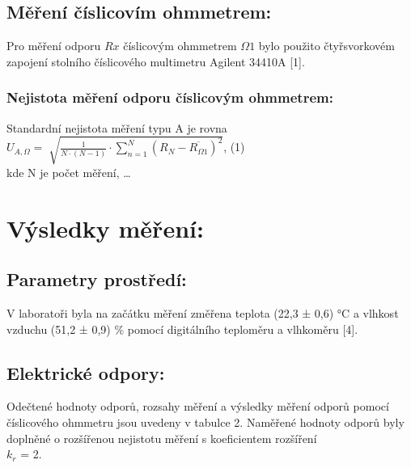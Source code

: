 \documentclass{article}
\begin{document}
	\subsection{Měření číslicovím ohmmetrem:}
	Pro měření odporu $Rx$ číslicovým ohmmetrem $\Omega 1$ bylo použito čtyřsvorkovém zapojení stolního číslicového multimetru Agilent 34410A [1].
	\subsubsection{Nejistota měření odporu číslicovým ohmmetrem:}
	Standardní nejistota měření typu A je rovna\\
	$U_{A,\Omega} = \sqrt[]{\frac{1}{N \cdot (N-1)} \cdot \sum_{n=1}^{N}(R_{N}-\overline{R_{\Omega 1}})^2}$, \hfill (1)\\
	kde N je počet měření, …
	\section{Výsledky měření:}
	\subsection{Parametry prostředí:}
	V laboratoři byla na začátku měření změřena teplota (22,3 ± 0,6) °C a vlhkost vzduchu (51,2 ± 0,9) \% pomocí digitálního teploměru a vlhkoměru [4].
	\subsection{Elektrické odpory:}
	Odečtené hodnoty odporů, rozsahy měření a výsledky měření odporů pomocí číslicového ohmmetru jsou uvedeny v tabulce 2. Naměřené hodnoty odporů byly doplněné o rozšířenou nejistotu měření s koeficientem rozšíření\\ $k_r$ = 2.
	
\end{document}

